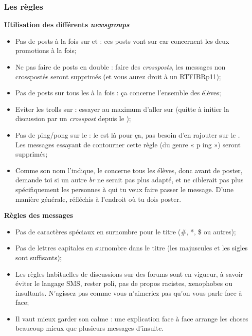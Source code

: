 \subsubsection{Les règles}
\textbf{Utilisation des différents \emph{newsgroups}}
\begin{itemize}

 \item Pas de posts à la fois sur  et  : ces posts vont sur  car concernent les deux promotions à la fois;
 \item Ne pas faire de posts en double : faire des \emph{crossposts}, les messages non crosspostés seront supprimés (et vous aurez droit à un RTFIBRp11);
 \item Pas de posts sur tous les  à la fois : ça concerne l'ensemble des élèves;
 \item Eviter les trolls sur  : essayer au maximum d'aller sur  (quitte à initier la discussion par un \emph{crosspost} depuis le );
 \item Pas de ping/pong sur le  : le  est là pour ça, pas besoin d'en rajouter sur le . Les messages essayant de contourner cette règle (du genre « p ing ») seront supprimés;
 \item Comme son nom l'indique, le  concerne tous les élèves, donc avant de poster, demande toi si un autre \emph{br} ne serait pas plus adapté, et ne ciblerait pas plus spécifiquement les personnes à qui tu veux faire passer le message. D'une manière générale, réfléchis à l'endroit où tu dois poster.

\end{itemize}

\textbf{Règles des messages}
\begin{itemize}
 \item Pas de caractères spéciaux en surnombre pour le titre (\#, *, \$ ou autres);
 \item Pas de lettres capitales en surnombre dans le titre (les majuscules et les sigles sont suffisants);
 \item Les règles habituelles de discussions sur des forums sont en vigueur, à savoir éviter le langage SMS, rester poli, pas de propos racistes, xenophobes ou insultants. N'agissez pas comme vous n'aimeriez pas qu'on vous parle face à face;
 \item Il vaut mieux garder son calme : une explication face à face arrange les choses beaucoup mieux que plusieurs messages d'insulte.
\end{itemize}

